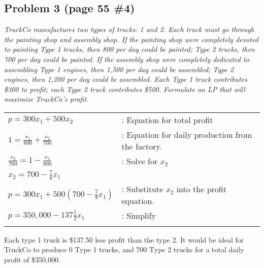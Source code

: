 \documentclass[a4paper,man,natbib]{apa6}
\begin{document}
\subsection{Problem 3 (page 55 \#4)}
\emph{
TruckCo manufactures two types of trucks: 1 and 2.
Each truck must go through the painting shop and assembly shop.
If the painting shop were completely devoted to painting 
Type 1 trucks, then 800 per day could be painted;
Type 2 trucks, then 700 per day could be painted.
If the assembly shop were completely dedicated to assembling
Type 1 engines, then 1,500 per day could be assembled;
Type 2 engines, then 1,200 per day could be assembled.
Each Type 1 truck contributes \$300 to profit;
each Type 2 truck contributes \$500.
Formulate an LP that will maximize TruckCo's profit. 
}\\
\doublespacing
\begin{tabular} {l l}
	$ p = 300x_1 + 500x_2 $ & : Equation for total profit \\
	$ 1 = \frac{x_1}{800} + \frac{x_2}{700} $ & 
	: Equation for daily production from the factory. \\
	$ \frac{x_2}{700} = 1 - \frac{x_1}{800} $ & : Solve for $x_2$ \\ 
	$ x_2 = 700 - \frac{7}{8}x_1 $ & \\
	$ p = 300x_1 + 500 \left( 700 - \frac{7}{8}x_1 \right) $ & 
	: Substitute $x_2$ into the profit equation. \\
	$ p = 350,000 - 137\frac{1}{2}x_1 $ & : Simplify \\	
	& \\
\end{tabular}
Each type 1 truck is \$137.50 less profit than the type 2. 
It would be ideal for TruckCo to produce 0 Type 1 trucks, and 
700 Type 2 trucks for a total daily profit of \$350,000. \\



\end{document}
